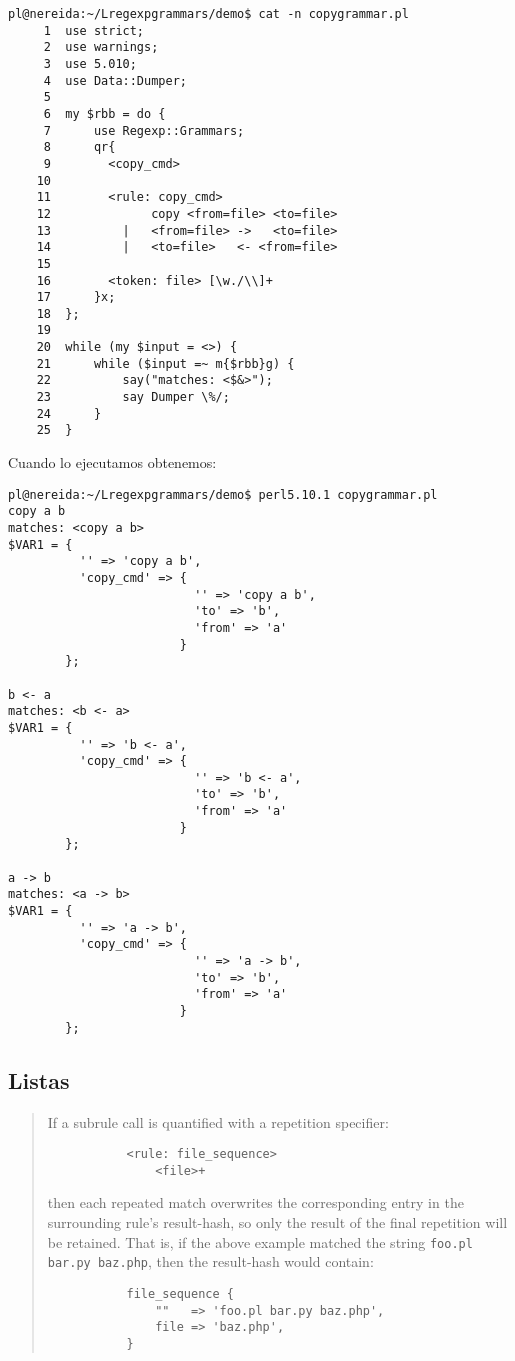 \begin{verbatim}
pl@nereida:~/Lregexpgrammars/demo$ cat -n copygrammar.pl
     1  use strict;
     2  use warnings;
     3  use 5.010;
     4  use Data::Dumper;
     5
     6  my $rbb = do {
     7      use Regexp::Grammars;
     8      qr{
     9        <copy_cmd>
    10
    11        <rule: copy_cmd>
    12              copy <from=file> <to=file>
    13          |   <from=file> ->   <to=file>
    14          |   <to=file>   <- <from=file>
    15
    16        <token: file> [\w./\\]+
    17      }x;
    18  };
    19
    20  while (my $input = <>) {
    21      while ($input =~ m{$rbb}g) {
    22          say("matches: <$&>");
    23          say Dumper \%/;
    24      }
    25  }
\end{verbatim}
Cuando lo ejecutamos obtenemos:
\begin{verbatim}
pl@nereida:~/Lregexpgrammars/demo$ perl5.10.1 copygrammar.pl
copy a b
matches: <copy a b>
$VAR1 = {
          '' => 'copy a b',
          'copy_cmd' => {
                          '' => 'copy a b',
                          'to' => 'b',
                          'from' => 'a'
                        }
        };

b <- a
matches: <b <- a>
$VAR1 = {
          '' => 'b <- a',
          'copy_cmd' => {
                          '' => 'b <- a',
                          'to' => 'b',
                          'from' => 'a'
                        }
        };

a -> b
matches: <a -> b>
$VAR1 = {
          '' => 'a -> b',
          'copy_cmd' => {
                          '' => 'a -> b',
                          'to' => 'b',
                          'from' => 'a'
                        }
        };
\end{verbatim}

\subsection{Listas}



\begin{it}
\begin{quotation}
If a subrule call is quantified with a repetition specifier:

\begin{verbatim}
           <rule: file_sequence>
               <file>+
\end{verbatim}

then each repeated match overwrites the corresponding entry in the
surrounding rule’s result-hash, so only the result of the final
repetition will be
retained. That is, if the above example matched the string  \verb"foo.pl bar.py baz.php", 
then the result-hash would contain:

\begin{verbatim}
           file_sequence {
               ""   => 'foo.pl bar.py baz.php',
               file => 'baz.php',
           }
\end{verbatim}
\end{quotation}\end{it}

